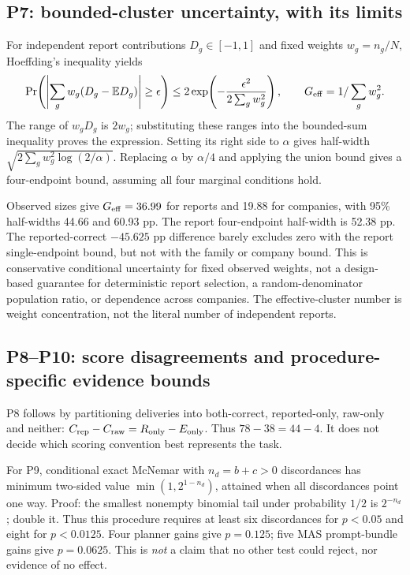 \subsection{P7: bounded-cluster uncertainty, with its limits}
For independent report contributions $D_g\in[-1,1]$ and fixed weights $w_g=n_g/N$, Hoeffding's inequality \citep{hoeffding} yields
\begin{equation}
 \Pr\!\left(\left|\sum_g w_g(D_g-\mathbb E D_g)\right|\geq\epsilon\right)
 \leq2\exp\!\left(-\frac{\epsilon^2}{2\sum_gw_g^2}\right),\qquad
 G_{\rm eff}=1/\sum_g w_g^2.
\end{equation}
The range of $w_gD_g$ is $2w_g$; substituting these ranges into the bounded-sum inequality proves the expression. Setting its right side to $\alpha$ gives half-width $\sqrt{2\sum_gw_g^2\log(2/\alpha)}$. Replacing $\alpha$ by $\alpha/4$ and applying the union bound gives a four-endpoint bound, assuming all four marginal conditions hold.

Observed sizes give $G_{\rm eff}=36.99$ for reports and 19.88 for companies, with 95\% half-widths 44.66 and 60.93 pp. The report four-endpoint half-width is 52.38 pp. The reported-correct $-45.625$ pp difference barely excludes zero with the report single-endpoint bound, but not with the family or company bound. This is conservative conditional uncertainty for fixed observed weights, not a design-based guarantee for deterministic report selection, a random-denominator population ratio, or dependence across companies. The effective-cluster number is weight concentration, not the literal number of independent reports.

\subsection{P8--P10: score disagreements and procedure-specific evidence bounds}
P8 follows by partitioning deliveries into both-correct, reported-only, raw-only and neither: $C_{\rm rep}-C_{\rm raw}=R_{\rm only}-E_{\rm only}$. Thus $78-38=44-4$. It does not decide which scoring convention best represents the task.

For P9, conditional exact McNemar with $n_d=b+c>0$ discordances has minimum two-sided value $\min(1,2^{1-n_d})$, attained when all discordances point one way. Proof: the smallest nonempty binomial tail under probability $1/2$ is $2^{-n_d}$; double it. Thus this procedure requires at least six discordances for $p<0.05$ and eight for $p<0.0125$. Four planner gains give $p=0.125$; five MAS prompt-bundle gains give $p=0.0625$. This is \emph{not} a claim that no other test could reject, nor evidence of no effect.

